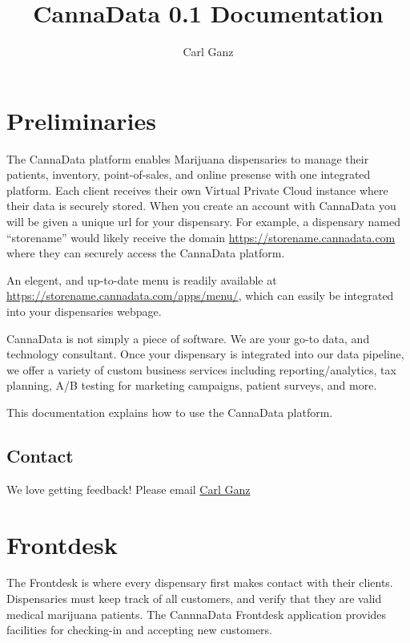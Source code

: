 \documentclass[]{book}
\title{CannaData 0.1 Documentation}
\author{Carl Ganz}
\date{}
\theoremstyle{definition}
\theoremstyle{definition}
\theoremstyle{definition}
\theoremstyle{remark}
\begin{document}
\maketitle

{
\setcounter{tocdepth}{1}
\tableofcontents
}
\chapter{Preliminaries}\label{preliminaries}

The CannaData platform enables Marijuana dispensaries to manage their
patients, inventory, point-of-sales, and online presense with one
integrated platform. Each client receives their own Virtual Private
Cloud instance where their data is securely stored. When you create an
account with CannaData you will be given a unique url for your
dispensary. For example, a dispensary named ``storename'' would likely
receive the domain \url{https://storename.cannadata.com} where they can
securely access the CannaData platform.

An elegent, and up-to-date menu is readily available at
\url{https://storename.cannadata.com/apps/menu/}, which can easily be
integrated into your dispensaries webpage.

CannaData is not simply a piece of software. We are your go-to data, and
technology consultant. Once your dispensary is integrated into our data
pipeline, we offer a variety of custom business services including
reporting/analytics, tax planning, A/B testing for marketing campaigns,
patient surveys, and more.

This documentation explains how to use the CannaData platform.

\section{Contact}\label{contact}

We love getting feedback! Please email
\href{mailto:carl@cannadatasolutions.com}{Carl Ganz}

\chapter{Frontdesk}\label{frontdesk}

The Frontdesk is where every dispensary first makes contact with their
clients. Dispensaries must keep track of all customers, and verify that
they are valid medical marijuana patients. The CannnaData Frontdesk
application provides facilities for checking-in and accepting new
customers.
\end{document}
